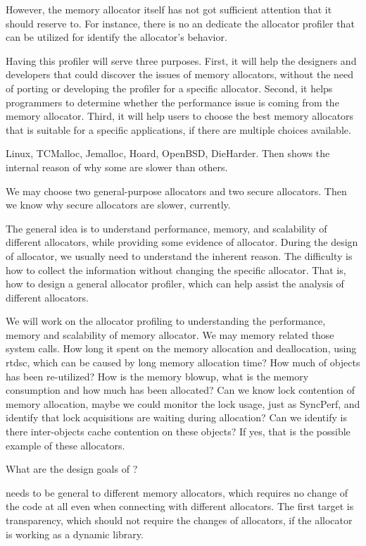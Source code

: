 However, the memory allocator itself has not got sufficient attention that it should reserve to. 
For instance, there is no an dedicate the allocator profiler that can be utilized for identify the allocator's behavior.

Having this profiler will serve three purposes. First, it will help the designers and developers that could discover the issues of memory allocators, without the need of porting or developing the profiler for a specific allocator. Second, it helps programmers to determine whether the performance issue is coming from the memory allocator. Third, it will help users to choose the best memory allocators that is suitable for a specific applications, if there are multiple choices available. 

 Linux, TCMalloc, Jemalloc, Hoard, OpenBSD, DieHarder. Then shows the internal reason of why some are slower than others. 

We may choose two general-purpose allocators and two secure allocators. Then we know why secure allocators are slower, currently. 

The general idea is to understand performance, memory, and scalability of different allocators, while providing some evidence of allocator. During the design of allocator, we usually need to understand the inherent reason. The difficulty is how to collect the information without changing the specific allocator. That is, how to design a general allocator profiler, which can help assist the analysis of different allocators. 

We will work on the allocator profiling to understanding the performance, memory and scalability of memory allocator. We may  memory related those system calls. How long it spent on the memory allocation and deallocation, using rtdsc, which can be caused by long memory allocation time? How much of objects has been re-utilized? How is the memory blowup, what is the memory consumption and how much has been allocated? Can we know lock contention of memory allocation, maybe we could monitor the lock usage, just as SyncPerf, and identify that lock acquisitions are  waiting during allocation? Can we identify is there inter-objects cache contention on these objects? If yes, that is the possible example of these allocators.  

What are the design goals of \MP{}? 

\MP{} needs to be general to different memory allocators, which requires no change of the code at all even when connecting with different allocators. The first target is transparency, which should not require the changes of allocators, if the allocator is working as a dynamic library. 

